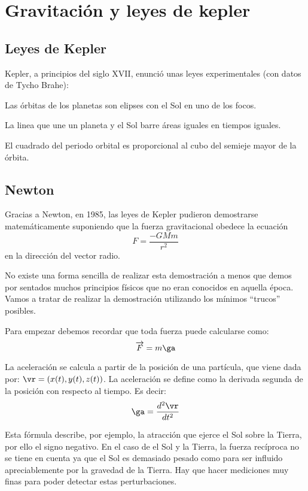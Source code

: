 
\chapter{Gravitación y leyes de kepler}
\section{Leyes de Kepler}

Kepler, a principios del siglo XVII, enunció unas leyes experimentales (con datos de Tycho Brahe):

\begin{lemma}
	Las órbitas de los planetas son elipses con el Sol en uno de los focos.
\end{lemma}

\begin{lemma}
	La linea que une un planeta y el Sol barre áreas iguales en tiempos iguales.
\end{lemma}

\begin{lemma}
	El cuadrado del periodo orbital es proporcional al cubo del semieje mayor de la órbita.
\end{lemma}

\section{Newton}

Gracias a Newton, en 1985, las leyes de Kepler pudieron demostrarse matemáticamente suponiendo que la fuerza gravitacional obedece la ecuación
\[ F = \frac{-GMm}{r^2} \]
en la dirección del vector radio.

No existe una forma sencilla de realizar esta demostración a menos que demos por sentados muchos principios físicos que no eran conocidos en aquella época. Vamos a tratar de realizar la demostración utilizando los mínimos ``trucos'' posibles.

Para empezar debemos recordar que toda fuerza puede calcularse como:
$$ \overrightarrow{F} = m\ga$$

La aceleración se calcula a partir de la posición de una partícula, que viene dada por: $\vr = (x(t), y(t), z(t))$. La aceleración se define como la derivada segunda de la posición con respecto al tiempo. Es decir:
\[ \ga = \frac{d^2\vr}{d t^2} \]

Esta fórmula describe, por ejemplo, la atracción que ejerce el Sol sobre la Tierra, por ello el signo negativo. En el caso de el Sol y la Tierra, la fuerza recíproca no se tiene en cuenta ya que el Sol es demasiado pesado como para ser influido apreciablemente por la gravedad de la Tierra. Hay que hacer mediciones muy finas para poder detectar estas perturbaciones.

